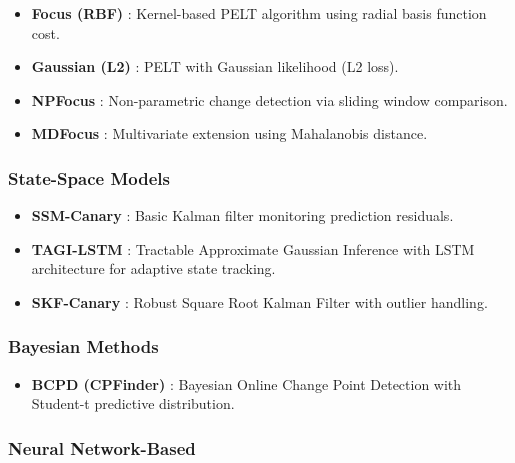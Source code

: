 \begin{itemize}
    \item \textbf{Focus (RBF)} \cite{truong2020selective}: Kernel-based PELT algorithm using radial basis function cost.
    
    \item \textbf{Gaussian (L2)} \cite{truong2020selective}: PELT with Gaussian likelihood (L2 loss).
    
    \item \textbf{NPFocus} \cite{truong2020selective}: Non-parametric change detection via sliding window comparison.
    
    \item \textbf{MDFocus} \cite{truong2020selective}: Multivariate extension using Mahalanobis distance.
\end{itemize}

\subsubsection{State-Space Models}

\begin{itemize}
    \item \textbf{SSM-Canary} \cite{canary2023}: Basic Kalman filter monitoring prediction residuals.
    
    \item \textbf{TAGI-LSTM} \cite{tagi2023}: Tractable Approximate Gaussian Inference with LSTM architecture for adaptive state tracking.
    
    \item \textbf{SKF-Canary} \cite{canary2023}: Robust Square Root Kalman Filter with outlier handling.
\end{itemize}

\subsubsection{Bayesian Methods}

\begin{itemize}
    \item \textbf{BCPD (CPFinder)} \cite{adams2007bayesian}: Bayesian Online Change Point Detection with Student-t predictive distribution.
\end{itemize}

\subsubsection{Neural Network-Based}

